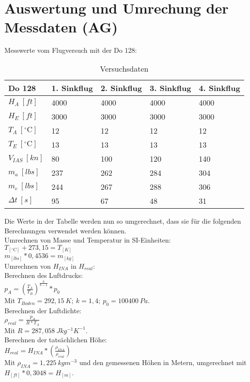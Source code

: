 \chapter{Auswertung und Umrechung der Messdaten (AG)}
\label{c:Auswertung}

Messwerte vom Flugversuch mit der Do 128: 

\begin{table}[h]
	\centering
	\begin{tabular}{| l | l | l | l | l | }
\hline
	Do 128 & 1. Sinkflug & 2. Sinkflug & 3. Sinkflug & 4. Sinkflug \\ \hline
	$H_A\ [ft]$ & 4000 & 4000 & 4000 & 4000 \\ \hline
	$H_E\ [ft]$  & 3000 & 3000 & 3000 & 3000 \\ \hline
	$T_A\ [^\circ\text{C}]$  & 12 & 12 & 12 & 12 \\ \hline
	$T_E\ [^\circ\text{C}]$  & 13 & 13 & 13 & 13 \\ \hline
	$V_{IAS}\ [kn]$ & 80 & 100 & 120 & 140 \\ \hline
	$m_a\ [lbs]$ & 237 & 262 & 284 & 304 \\ \hline
	$m_e\ [lbs]$ & 244 & 267 & 288 & 306 \\ \hline
	$\Delta t\ [s]$ & 95 & 67 & 48 & 31 \\ \hline
\end{tabular}
	\caption{Versuchsdaten}
	\label{tab:VersuchDaten2}
\end{table}
Die Werte in der Tabelle werden nun so umgerechnet, dass sie für die folgenden Berechnungen verwendet werden können.\\
Umrechnen von Masse und Temperatur in SI-Einheiten:\\


$T_{[^\circ\text{C}]}+273,15=T_{[K]}$\\
$m_{[lbs]}*0,4536=m_{[kg]}$\\

Umrechnen von $H_{INA}$ in $H_{real}$:\\
Berechnen des Luftdrucks:\\
$p_A=(\frac{T_A}{T_B})^ {\frac{k}{k-1}}*p_0$\\
Mit $T_{Boden}=292,15\ K;\ k=1,4;\ p_0=100400\ Pa$.\\
Berechnen der Luftdichte:\\
$\rho_{real}=\frac{p_A}{R*T_A}$\\
Mit $R=287,058\ Jkg^{-1}K^{-1}$.\\
Berechnen der tatsächlichen Höhe:\\
$H_{real}=H_{INA}*\left(\frac{\rho _{INA}}{\rho _{real}}\right) $\\
Mit $\rho_{INA}=1,225\ kgm^{-3}$ und den gemessenen Höhen in Metern, umgerechnet mit
$H_{[ft]}*0,3048=H_{[m]} $.\\

